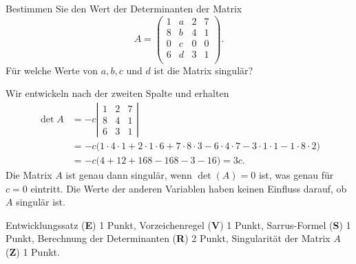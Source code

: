 Bestimmen Sie den Wert der Determinanten der Matrix
\[
A=\begin{pmatrix}
   1&  a&  2&  7\\
   8&  b&  4&  1\\
   0&  c&  0&  0\\
   6&  d&  3&  1\\
\end{pmatrix}.
\]
Für welche Werte von $a,b,c$ und $d$ ist die Matrix singulär?

\begin{loesung}
Wir entwickeln nach der zweiten Spalte und erhalten
\begin{align*}
\det A
&=
-c\left|\begin{matrix}
   1&  2&  7\\
   8&  4&  1\\
   6&  3&  1
\end{matrix}\right|
\\
&=
-c\bigl(
1\cdot4\cdot1
+
2\cdot1\cdot6
+
7\cdot8\cdot3
-
6\cdot4\cdot7
-
3\cdot1\cdot1
-
1\cdot8\cdot2
\bigr)
\\
&=
-c\bigl(
4+12+168
-168-3-16
\bigr)
=
3c.
\end{align*}
Die Matrix $A$ ist genau dann singulär, wenn $\det(A)=0$ ist, was genau 
für $c=0$ eintritt.
Die Werte der anderen Variablen haben keinen Einfluss darauf, ob $A$
singulär ist.
\end{loesung}

\begin{bewertung}
Entwicklungssatz ({\bf E}) 1 Punkt,
Vorzeichenregel ({\bf V}) 1 Punkt,
Sarrus-Formel ({\bf S}) 1 Punkt,
Berechnung der Determinanten ({\bf R}) 2 Punkt,
Singularität der Matrix $A$ ({\bf Z}) 1 Punkt.
\end{bewertung}


